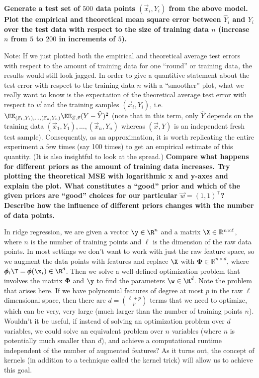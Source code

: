 \documentclass[preview]{standalone}
\begin{document}
\begin{Parts}
{\bf Generate a test set of $500$ data points $(\vec{x}_i, Y_i)$ from the
  above model. Plot the empirical and theoretical mean square error
  between $\hat Y_i$ and $Y_i$ over the test data with respect to the
  size of training data $n$ (increase $n$ from $5$ to $200$ in
  increments of $5$). }

Note: If we just plotted both the empirical and theoretical average
test errors with respect to the amount of training data for one
``round'' or training data, the results would still look jagged. In
order to give a quantitive statement about the test error with respect
to the training data $n$ with a ``smoother'' plot, what we really want
to know is the expectation of the theoretical average test error with
respect to $\vec{w}$ and the training samples $(\vec{x}_i,Y_i)$, i.e.
$\EE_{(\vec{x}_1,Y_1),\dots, (\vec{x}_n,Y_n)}\EE_{Z,\vec{x}}(Y-\widehat{Y})^2$ (note
that in this term, only $\widehat{Y}$ depends on the training data
$(\vec{x}_1,Y_1),\dots, (\vec{x}_n,Y_n)$ whereas $(\vec{x},Y)$ is an independent fresh
test sample). Consequently, as an approximation, it is worth
replicating the entire experiment a few times (say 100 times) to get
an empirical estimate of this quantity. (It is also insightful to look
at the spread.)  {\bf  Compare what happens for different priors as the amount
of training data increases. Try plotting the theoretical MSE
  with logarithmic x and y-axes and explain the plot.  What
  constitutes a ``good'' prior and which of the given priors are
  ``good'' choices for our particular $\vec{w} = (1,1)^\top$? Describe
  how the influence of different priors changes with the number of
  data points.}



\end{Parts}


In ridge regression, we are given a vector $\y \in \R^{n}$ and a matrix $\X \in \mathbb{R}^{n \times
\ell}$, where $n$ is the number of training points and $\ell$ is the dimension of the raw data points. In
most settings we don't want to work with just the raw feature space, so we augment the
data points with features and replace $\X$ with $\bm{\Phi} \in \mathbb{R}^{n \times d}$, where
$\pmb{\phi}_i\T = \pmb{\phi}(\x_i) \in \R^{d}$. Then we solve a well-defined optimization problem
that involves the matrix $\bm{\Phi}$ and $\y$ to find the parameters $\w \in \R^{d}$. Note the problem that
arises here. If we have polynomial features of degree at most $p$ in the raw $\ell$ dimensional space,
then there are $d = \binom{\ell+p}{p}$ terms that we need to optimize, which can be very, very large
(much larger than the number of training points $n$). Wouldn't it be useful, if instead of solving
an optimization problem over $d$ variables, we could solve an equivalent problem over $n$ variables
(where $n$ is potentially much smaller than $d$), and achieve a computational runtime independent of the number of
augmented features? As it turns out, the concept of kernels (in addition to a technique called the
kernel trick) will allow us to achieve this goal.
\end{document}
